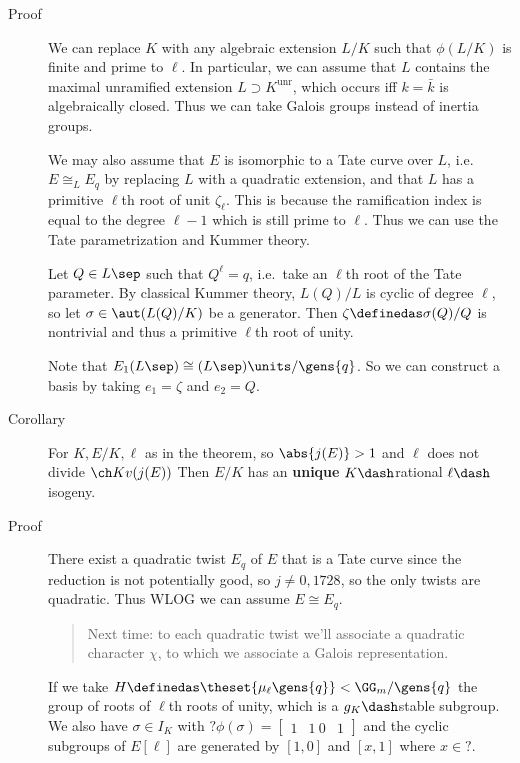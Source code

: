 \begin{description}
\item[Proof]
We can replace \(K\) with any algebraic extension \(L/K\) such that
\(\phi(L/K)\) is finite and prime to \(\ell\). In particular, we can
assume that \(L\) contains the maximal unramified extension
\(L \supset K^\text{unr}\), which occurs iff \(k = \bar k\) is
algebraically closed. Thus we can take Galois groups instead of inertia
groups.

We may also assume that \(E\) is isomorphic to a Tate curve over \(L\),
i.e.~\(E \cong_L E_q\) by replacing \(L\) with a quadratic extension,
and that \(L\) has a primitive \(\ell\)th root of unit \(\zeta_\ell\).
This is because the ramification index is equal to the degree \(\ell-1\)
which is still prime to \(\ell\). Thus we can use the Tate
parametrization and Kummer theory.

Let \(Q \in L\sep\) such that \(Q^\ell = q\), i.e.~take an \(\ell\)th
root of the Tate parameter. By classical Kummer theory, \(L(Q) / L\) is
cyclic of degree \(\ell\), so let \(\sigma \in \aut(L(Q) / K)\) be a
generator. Then \(\zeta \definedas \sigma(Q) / Q\) is nontrivial and
thus a primitive \(\ell\)th root of unity.

Note that \(E_1(L\sep) \cong (L\sep)\units / \gens{q}\). So we can
construct a basis by taking \(e_1 = \zeta\) and \(e_2 = Q\).
\item[Corollary]
For \(K, E/K, \ell\) as in the theorem, so \(\abs{j(E)} > 1\) and
\(\ell\) does not divide \(\ch K v(j(E))\) Then \(E/K\) has an
\textbf{unique} \(K\dash\)rational \(\ell\dash\)isogeny.
\item[Proof]
There exist a quadratic twist \(E_q\) of \(E\) that is a Tate curve
since the reduction is not potentially good, so \(j\neq 0, 1728\), so
the only twists are quadratic. Thus WLOG we can assume \(E \cong E_q\).

\begin{quote}
Next time: to each quadratic twist we'll associate a quadratic character
\(\chi\), to which we associate a Galois representation.
\end{quote}

If we take \(H \definedas \theset{\mu_\ell \gens{q}} < \GG_m/\gens{q}\)
the group of roots of \(\ell\)th roots of unity, which is a
\(g_K\dash\)stable subgroup. We also have \(\sigma \in I_K\) with
\(?\phi(\sigma) = \begin{bmatrix} 1 & 1 \
0 & 1 \end{bmatrix}\) and the cyclic subgroups of \(E[\ell]\) are
generated by \([1, 0]\) and \([x, 1]\) where \(x\in ?\).
\end{description}

